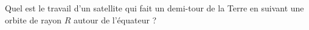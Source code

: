 
\begin{exercice}\label{exoOutilsMath-0052}

    Quel est le travail d'un satellite qui fait un demi-tour de la Terre en suivant une orbite de rayon $R$ autour de l'équateur ?

\end{exercice}
